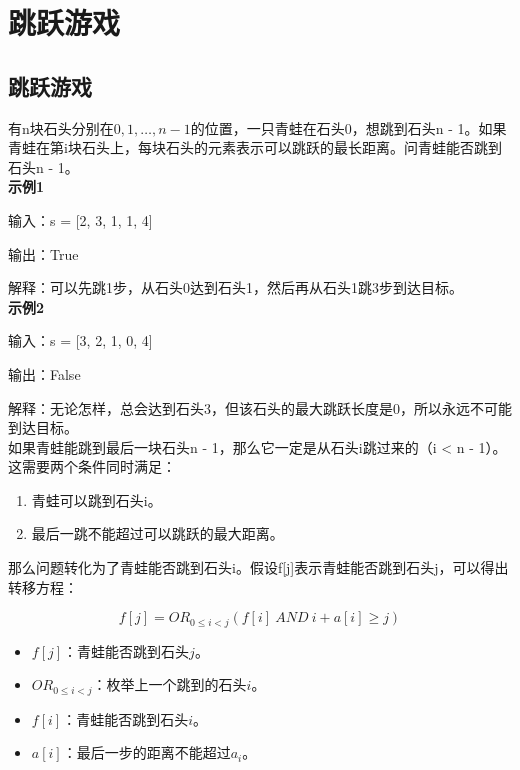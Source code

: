 \section{跳跃游戏}

\subsection{跳跃游戏}

有n块石头分别在$ 0, 1, \dots, n-1 $的位置，一只青蛙在石头0，想跳到石头n - 1。如果青蛙在第i块石头上，每块石头的元素表示可以跳跃的最长距离。问青蛙能否跳到石头n - 1。 \\

\textbf{示例1}

输入：s = [2, 3, 1, 1, 4]

输出：True

解释：可以先跳1步，从石头0达到石头1，然后再从石头1跳3步到达目标。 \\

\textbf{示例2}

输入：s = [3, 2, 1, 0, 4]

输出：False

解释：无论怎样，总会达到石头3，但该石头的最大跳跃长度是0，所以永远不可能到达目标。 \\

如果青蛙能跳到最后一块石头n - 1，那么它一定是从石头i跳过来的（i < n - 1）。 \\

这需要两个条件同时满足：

\begin{enumerate}
	\item 青蛙可以跳到石头i。
	\item 最后一跳不能超过可以跳跃的最大距离。
\end{enumerate}

那么问题转化为了青蛙能否跳到石头i。假设f[j]表示青蛙能否跳到石头j，可以得出转移方程：

\vspace{-0.5cm}

$$
	f[j] = OR_{0 \le i < j}(f[i]\ AND\ i + a[i] \ge j)
$$

\begin{itemize}
	\item $ f[j] $：青蛙能否跳到石头$ j $。

	\item $ OR_{0 \le i < j} $：枚举上一个跳到的石头$ i $。

	\item $ f[i] $：青蛙能否跳到石头$ i $。

	\item $ a[i] $：最后一步的距离不能超过$ a_i $。
\end{itemize}

